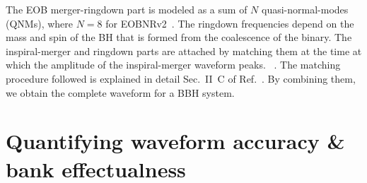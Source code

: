 The EOB merger-ringdown part is modeled as a sum of $N$ quasi-normal-modes 
(QNMs),
where $N=8$ for EOBNRv2~\cite{EOBNRdevel01,EOBNRdevel02,EOBNRdevel04,BHRDQNMs}.
The ringdown frequencies depend on the mass and spin of the BH that is formed 
from the coalescence of the binary. The inspiral-merger and ringdown parts are
attached by matching them at the time at which the amplitude of the 
inspiral-merger waveform peaks.
~\cite{EOBNRdevel01,BuonannoEOBv2Main}. The matching procedure followed
is explained in detail Sec.~II~C of Ref.~\cite{BuonannoEOBv2Main}.
By combining them, we obtain the complete waveform for a BBH system.

\section{Quantifying waveform accuracy \& bank effectualness}\label{s1:quantifyingerrors}

